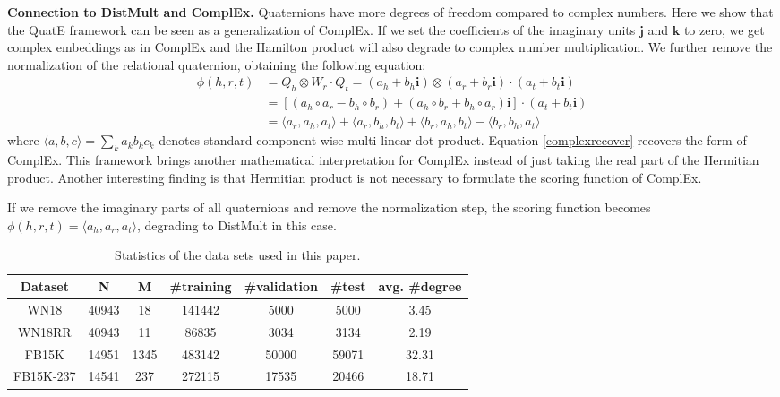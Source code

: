 \documentclass{article}
\begin{document}
\textbf{Connection to DistMult and ComplEx.} Quaternions have more degrees of freedom compared to complex numbers. Here we show that the QuatE framework can be seen as a generalization of ComplEx. If we set the coefficients of the imaginary units $\textbf{j}$ and $\textbf{k}$ to zero, we get complex embeddings as in ComplEx and the Hamilton product will also degrade to complex number multiplication. We further remove the normalization of the relational quaternion, obtaining the following equation:
\begin{equation}
\label{complexrecover}
\begin{split}
        \phi(h, r, t) &= Q_h \otimes W_r \cdot Q_t = (a_h + b_h \textbf{i}) \otimes (a_r + b_r \textbf{i}) \cdot (a_t + b_t \textbf{i}) \\ &= [(a_h \circ a_r - b_h\circ b_r) + (a_h\circ b_r + b_h\circ a_r) \textbf{i}] \cdot (a_t + b_t \textbf{i}) \\
        &= \langle a_r, a_h, a_t\rangle + \langle a_r, b_h, b_t\rangle  + \langle b_r, a_h,b_t\rangle  - \langle b_r, b_h, a_t\rangle
\end{split}
\end{equation}
where $\langle a, b, c\rangle = \sum_{k} a_k b_k c_k$ denotes standard component-wise multi-linear dot product. Equation \ref{complexrecover} recovers the form of ComplEx. This framework brings another mathematical interpretation for ComplEx instead of just taking the real part of the Hermitian product. Another interesting finding is that Hermitian product is not necessary to formulate the scoring function of ComplEx.






If we remove the imaginary parts of all quaternions and remove the normalization step, the scoring function becomes $\phi(h, r, t) = \langle a_h, a_r, a_t\rangle$, degrading to DistMult in this case.

\begin{table}[t]
\centering
\caption{Statistics of the data sets used in this paper.}
\label{datasets}
\small
\begin{tabular}{ccccccc}
\toprule
Dataset   & N & M & \#training & \#validation & \#test  & avg. \#degree\\
\midrule
WN18     &  40943  & 18  &      141442      &     5000         & 5000    &  3.45  \\
WN18RR    &   40943 & 11  &       86835     &     3034         &    3134  & 2.19  \\
FB15K     & 14951  &   1345&          483142  &       50000       &     59071  &32.31 \\
FB15K-237 &  14541 & 237  &    272115        &   17535           &      20466 & 18.71\\ \bottomrule
\end{tabular}
\vspace{-1.em}
\end{table}
\end{document}
